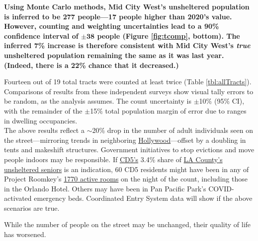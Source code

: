 \documentclass[11pt]{article}
\begin{document}
\textbf{Using Monte Carlo methods, Mid City West's unsheltered population is inferred to be 
277 people---17 people higher than 2020's value. However, counting and weighting uncertainties lead
to a 90\% confidence interval of $\mathbf{\pm38}$ people (Figure \ref{fig:tcomp}, bottom). The 
inferred 7\% increase is therefore consistent with Mid City West's \emph{true} unsheltered population 
remaining the same as it was last year. (Indeed, there is a 22\% chance that it decreased.)}


Fourteen out of 19 total tracts were counted at least twice (Table \ref{tbl:allTracts}). 
Comparisons of results from these independent surveys show visual 
tally errors to be random, as the analysis assumes. The count uncertainty is $\pm$10\% (95\% CI), 
with the remainder of the $\pm$15\% total population margin of error due to ranges in 
dwelling occupancies.\\

 The above results reflect a $\sim$20\% drop in the number
of adult individuals seen on the street---mirroring trends in neighboring 
\href{https://www.latimes.com/homeless-housing/story/2021-04-13/despite-appearances-15-fewer-homeless-people-were-on-hollywood-streets-this-year}{Hollywood}---offset by a doubling in tents and 
makeshift structures. Government initiatives to stop evictions and move people indoors may be 
responsible. If \href{https://www.lahsa.org/documents?id=4664-2020-homeless-count-council-district-5}{CD5's} 3.4\% share of \href{https://www.lahsa.org/documents?id=4585-2020-greater-los-angeles-homeless-count-los-angeles-continuum-of-care-coc-}{LA County's unsheltered seniors} 
is an indication, 60 CD5 residents might have been in any of Project Roomkey's 
\href{https://projectroomkeytracker.com/}{1770 active rooms} on the night of the count, including 
those in the Orlando Hotel. Others
may have been in Pan Pacific Park's COVID-activated emergency beds. Coordinated Entry System data 
will show if the above scenarios are true.

While the number of people on the street may be unchanged, their quality of life has worsened. 
\end{document}
